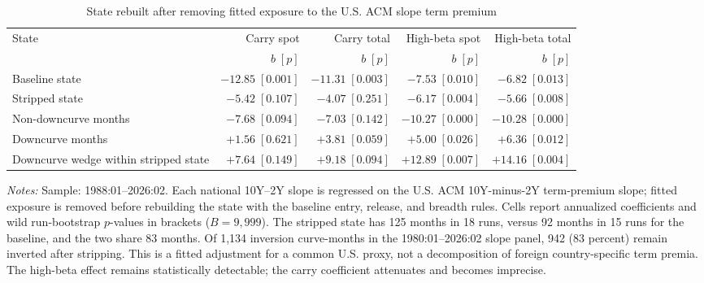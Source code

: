 \begin{table}[H]
\centering
\caption{State rebuilt after removing fitted exposure to the U.S. ACM slope term premium}
\label{tab:v03-term-premium}
\small
\setlength{\tabcolsep}{3.5pt}
\begin{tabularx}{\textwidth}{>{\raggedright\arraybackslash}Xrrrr}
\toprule
State & Carry spot & Carry total & High-beta spot & High-beta total \\
& $b\;[p]$ & $b\;[p]$ & $b\;[p]$ & $b\;[p]$ \\
\midrule
Baseline state & $-12.85\;[0.001]$ & $-11.31\;[0.003]$ & $-7.53\;[0.010]$ & $-6.82\;[0.013]$ \\
Stripped state & $-5.42\;[0.107]$ & $-4.07\;[0.251]$ & $-6.17\;[0.004]$ & $-5.66\;[0.008]$ \\
\quad Non-downcurve months & $-7.68\;[0.094]$ & $-7.03\;[0.142]$ & $-10.27\;[0.000]$ & $-10.28\;[0.000]$ \\
\quad Downcurve months & $+1.56\;[0.621]$ & $+3.81\;[0.059]$ & $+5.00\;[0.026]$ & $+6.36\;[0.012]$ \\
Downcurve wedge within stripped state & $+7.64\;[0.149]$ & $+9.18\;[0.094]$ & $+12.89\;[0.007]$ & $+14.16\;[0.004]$ \\
\bottomrule
\end{tabularx}

\begin{minipage}{0.96\textwidth}
\footnotesize\emph{Notes:} Sample: 1988:01--2026:02. Each national 10Y--2Y slope is regressed on the U.S. ACM 10Y-minus-2Y term-premium slope; fitted exposure is removed before rebuilding the state with the baseline entry, release, and breadth rules. Cells report annualized coefficients and wild run-bootstrap $p$-values in brackets ($B=9{,}999$). The stripped state has 125 months in 18 runs, versus 92 months in 15 runs for the baseline, and the two share 83 months. Of 1,134 inversion curve-months in the 1980:01--2026:02 slope panel, 942 (83 percent) remain inverted after stripping. This is a fitted adjustment for a common U.S. proxy, not a decomposition of foreign country-specific term premia. The high-beta effect remains statistically detectable; the carry coefficient attenuates and becomes imprecise.
\end{minipage}
\end{table}
